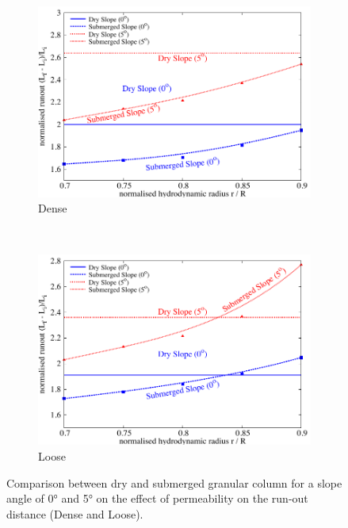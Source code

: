 \begin{figure}[!h]
	\centering
\begin{subfigure}[b]{0.85\textwidth}
	\centering
    \includegraphics[width=\textwidth]{Perm_Runout_a08_dense}
    \caption{Dense}
    \label{fig:Perm_Runout_a08_dense}
\end{subfigure}\\
\begin{subfigure}[b]{0.85\textwidth}
	\centering
    \includegraphics[width=\textwidth]{Perm_Runout_a08_loose}
    \caption{Loose}
    \label{fig:Perm_Runout_a08_loose}
\end{subfigure}
\caption{Comparison between dry and submerged granular column for a slope angle 
of 0\si{\degree} and 5\si{\degree} on the effect of permeability on the run-out 
distance (Dense and Loose).}
\label{fig:Perm_Runout_loose_dense}
\end{figure}

